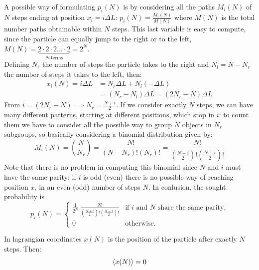 \documentclass[../main/main.tex]{subfiles}
\begin{document}
A possible way of formulating $p_i(N)$ is by considering all the paths $M_i(N)$ of $N$ steps ending at position $x_i=i\Delta L$: $p_i(N)=\frac{M_i(N)}{M(N)}$ where $M(N)$ is the total number paths obtainable within $N$ steps. This last variable is easy to compute, since the particle can equally jump to the right or to the left, $M(N)=\underbrace{2\cdot2\cdot2\dots\cdot2}_{\text{$N$-terms}}=2^N$. \\
Defining $N_r$ the number of steps the particle takes to the right and $N_l=N-N_r$ the number of steps it takes to the left, then:
\begin{equation*}
    \begin{split}
        x_i(N) = i\Delta L &= N_r\Delta L+N_l(-\Delta L) \\
        &= (N_r-N_l)\Delta L = (2N_r-N)\Delta L 
    \end{split}
\end{equation*}
From $i=(2N_r-N)\implies N_r = \frac{N+i}{2}$. If we consider exactly $N$ steps, we can have many different patterns, starting at different positions, which stop in $i$: to count them we have to consider all the possible way to group $N$ objects in $N_r$ subgroups, so basically considering a binomial distribution given by:
\[
    M_i(N) = \binom{N}{N_r}=\frac{N!}{(N-N_r)!(N_r)!} = \frac{N!}{(\frac{N-i}{2})!(\frac{N+i}{2})!}
\]
Note that there is no problem in computing this binomial since $N$ and $i$ must have the same parity: if $i$ is odd (even) there is no possible way of reaching position $x_i$ in an even (odd) number of steps $N$. 
In conlusion, the sought probability is 
\begin{equation}
    p_i(N) = 
    \begin{cases}
        \frac{1}{2^N}\:\frac{N!}{(\frac{N+i}{2})!(\frac{N-i}{2})!} & \text{if $i$ and $N$ share the same parity,} \\
        0 & \text{otherwise.}
    \end{cases}
\end{equation}   


In lagrangian coordinates $x(N)$ is the position of the particle after exactly $N$ steps. Then:
\begin{equation}
    \langle x(N) \rangle=0
    \label{eq:mean_zero}
\end{equation}
\end{document}
